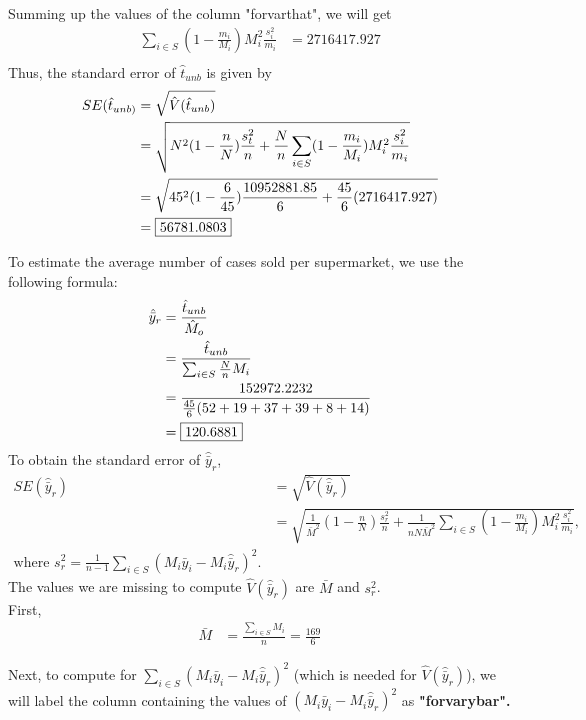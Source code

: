 \documentclass[]{article}
\begin{document}
Summing up the values of the column "forvarthat", we will get 
\[
\begin{aligned}
\sum_{i \in S}\left(1 - \frac{m_i}{M_i}\right)M_i^2\frac{s_i^2}{m_i} &= 2716417.927  \\
\end{aligned}
\]
Thus, the standard error of $\hat t_{unb}$ is given by
\[
\begin{aligned}
SE(\hat t_{unb)} &= \sqrt{\hat V(\hat t_{unb})} \\
&= \sqrt{N^2(1-\frac{n}{N})\frac{s_t^2}{n} + \frac{N}{n}\sum_{i \in S}(1-\frac{m_i}{M_i})M_i^2\frac{s_i^2}{m_i}} \\
&= \sqrt{45^2(1-\frac{6}{45})\frac{10952881.85}{6} + \frac{45}{6}(2716417.927)} \\
&= \fbox{56781.0803}
\end{aligned}
\]

To estimate the average number of cases sold per supermarket, we use the following formula:
\[
\begin{aligned}
\hat{\bar y}_r &= \frac{\hat t_{unb}}{\hat M_o} \\
&= \frac{\hat t_{unb}}{\sum_{i \in S}\frac{N}{n}M_i} \\
&= \frac{152972.2232}{\frac{45}{6}(52  + 19 + 37 + 39 + 8 + 14)} \\
&= \fbox{120.6881}
\end{aligned}
\]
To obtain the standard error of $\hat{\bar y}_r$, 
\[
\begin{aligned}
SE(\hat{\bar y}_r) &= \sqrt{\hat V(\hat{\bar y}_r)} \\
&= \sqrt{\frac{1}{\bar M^2}\left(1-\frac{n}{N}\right)\frac{s_r^2}{n} + \frac{1}{nN\bar M^2}\sum_{i \in S}\left(1 - \frac{m_i}{M_i}\right)M_i^2\frac{s_i^2}{m_i}}, \\
\text{where } s_r^2 = \frac{1}{n-1}\sum_{i \in S}(M_i\bar y_i - M_i\hat{\bar y}_r)^2.
\end{aligned}
\]
The values we are missing to compute $\hat V(\hat{\bar y}_r)$ are $\bar M$ and $s_r^2$. \\

First,
\[
\begin{aligned}
\bar M &= \frac{\sum_{i \in S}M_i}{n} = \frac{169}{6}
\end{aligned}
\]

Next, to compute for $\sum_{i \in S}(M_i\bar y_i - M_i\hat{\bar y}_r)^2$ (which is needed for $\hat V(\hat{\bar y}_r)$), we will label the column containing the values of $(M_i\bar y_i - M_i\hat{\bar y}_r)^2$ as \textbf{"forvarybar".} \\
\end{document}
